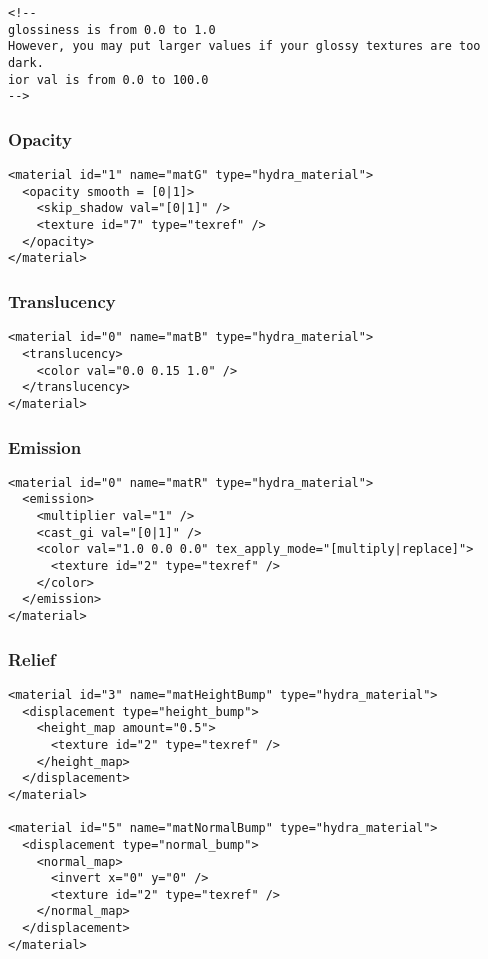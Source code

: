\documentclass[a4paper,11pt]{report}
\begin{document}
\lstset{language=XML}
\begin{lstlisting}
<!-- 
glossiness is from 0.0 to 1.0
However, you may put larger values if your glossy textures are too dark.
ior val is from 0.0 to 100.0
-->
\end{lstlisting}

\subsubsection{Opacity}
\lstset{language=XML}
\begin{lstlisting}
<material id="1" name="matG" type="hydra_material">
  <opacity smooth = [0|1]>
    <skip_shadow val="[0|1]" />
    <texture id="7" type="texref" />
  </opacity>
</material>
\end{lstlisting}

\subsubsection{Translucency}
\lstset{language=XML}
\begin{lstlisting}
<material id="0" name="matB" type="hydra_material">
  <translucency>
    <color val="0.0 0.15 1.0" />
  </translucency>
</material>
\end{lstlisting}

\subsubsection{Emission}
\lstset{language=XML}
\begin{lstlisting}
<material id="0" name="matR" type="hydra_material">
  <emission>
    <multiplier val="1" />
    <cast_gi val="[0|1]" />
    <color val="1.0 0.0 0.0" tex_apply_mode="[multiply|replace]">
      <texture id="2" type="texref" />
    </color>    
  </emission>
</material>
\end{lstlisting}

\subsubsection{Relief}
\lstset{language=XML}
\begin{lstlisting}
<material id="3" name="matHeightBump" type="hydra_material">
  <displacement type="height_bump">
    <height_map amount="0.5">
      <texture id="2" type="texref" />
    </height_map>
  </displacement>
</material>

<material id="5" name="matNormalBump" type="hydra_material">
  <displacement type="normal_bump">
    <normal_map>
      <invert x="0" y="0" />
      <texture id="2" type="texref" />
    </normal_map>
  </displacement>
</material>
\end{lstlisting}
\end{document}
